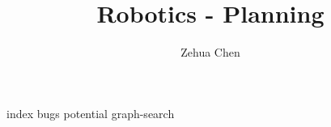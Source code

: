 \documentclass[11pt]{report}
\title{Robotics - Planning}
\author{Zehua Chen}
\begin{document}
  \maketitle
  \tableofcontents

  {index}
  {bugs}
  {potential}
  {graph-search}
  

  \newpage
  \printglossaries
\end{document}
